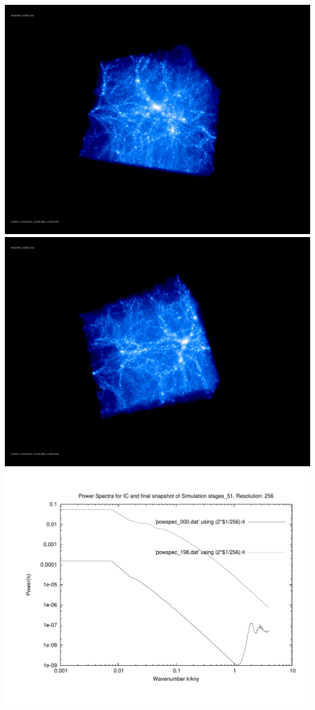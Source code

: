 \includegraphics[scale=0.1]{r256/stages_51/rotate_00074.jpg} 
\includegraphics[scale=0.1]{r256/stages_51/rotate_00131.jpg}  \\

\includegraphics[scale=0.5]{r256/stages_51/plot_powspec_stages_51}

